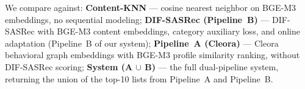 We compare against:
\textbf{Content-KNN} --- cosine nearest neighbor on BGE-M3 embeddings,
no sequential modeling;
\textbf{DIF-SASRec (Pipeline~B)} --- DIF-SASRec with BGE-M3 content embeddings,
category auxiliary loss, and online adaptation (Pipeline~B of our system);
\textbf{Pipeline~A (Cleora)} --- Cleora behavioral graph embeddings with BGE-M3
profile similarity ranking, without DIF-SASRec scoring;
\textbf{System (A $\cup$ B)} --- the full dual-pipeline system, returning the
union of the top-10 lists from Pipeline~A and Pipeline~B.
